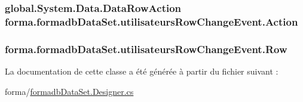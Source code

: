 \subsubsection[{\texorpdfstring{Action}{Action}}]{\setlength{\rightskip}{0pt plus 5cm}global.\+System.\+Data.\+Data\+Row\+Action forma.\+formadb\+Data\+Set.\+utilisateurs\+Row\+Change\+Event.\+Action\hspace{0.3cm}{\ttfamily [get]}}\hypertarget{classforma_1_1formadb_data_set_1_1utilisateurs_row_change_event_a6749830b2823bf87ca30888ee58b8d8f}{}\label{classforma_1_1formadb_data_set_1_1utilisateurs_row_change_event_a6749830b2823bf87ca30888ee58b8d8f}
\subsubsection[{\texorpdfstring{Row}{Row}}]{ forma.\+formadb\+Data\+Set.\+utilisateurs\+Row\+Change\+Event.\+Row\hspace{0.3cm}{\ttfamily [get]}}\hypertarget{classforma_1_1formadb_data_set_1_1utilisateurs_row_change_event_a5902232851085b92452bb961d2bd9626}{}\label{classforma_1_1formadb_data_set_1_1utilisateurs_row_change_event_a5902232851085b92452bb961d2bd9626}


La documentation de cette classe a été générée à partir du fichier suivant \+:\begin{DoxyCompactItemize}
\item 
forma/\hyperlink{formadb_data_set_8_designer_8cs}{formadb\+Data\+Set.\+Designer.\+cs}\end{DoxyCompactItemize}

